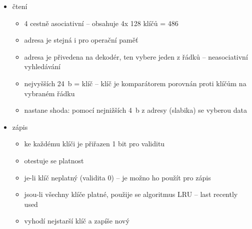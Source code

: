 \documentclass[a4paper,12pt]{article}
\providecommand{\tightlist}{%
\setlength{\itemsep}{0pt}\setlength{\parskip}{0pt}}
\begin{document}
\begin{itemize}
  \tightlist
  \item čtení
  \begin{itemize}
    \tightlist
    \item 4 cestně asociativní -- obsahuje 4x 128 klíčů = 486
    \item adresa je stejná i pro operační paměť
    \item adresa je přivedena na dekodér, ten vybere jeden z řádků --
    neasociativní vyhledávání
    \item nejvyšších 24~b = klíč -- klíč je komparátorem porovnán proti klíčům
    na vybraném řádku
    \item nastane shoda: pomocí nejnižších 4~b z adresy (slabika) se vyberou data
  \end{itemize}
  \item zápis
  \begin{itemize}
    \tightlist
    \item ke každému klíči je přiřazen 1 bit pro validitu
    \item otestuje se platnost
    \item je-li klíč neplatný (validita 0) -- je možno ho použít pro zápis
    \item jsou-li všechny klíče platné, použije se algoritmus LRU -- last
    recently used
    \item vyhodí nejstarší klíč a zapíše nový
  \end{itemize}
\end{itemize}
\end{document}

